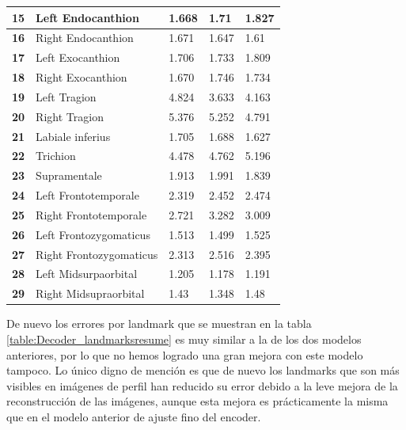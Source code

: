 \begin{table}[!ht]
\begin{tabular}{|l|l|l|l|l|}
                \textbf{15} & Left Endocanthion & \cellcolor{green!25} 1.668 & 1.71 & 1.827 \\ \hline
                \textbf{16} & Right Endocanthion & 1.671 & 1.647 & \cellcolor{green!25} 1.61 \\ \hline
                \textbf{17} & Left Exocanthion & \cellcolor{green!25} 1.706 & 1.733 & 1.809 \\ \hline
                \textbf{18} & Right Exocanthion & \cellcolor{green!25} 1.670 & 1.746 & 1.734 \\ \hline
                \textbf{19} & Left Tragion & 4.824 & \cellcolor{green!25} 3.633 & 4.163 \\ \hline
                \textbf{20} & Right Tragion & 5.376 & 5.252 & \cellcolor{green!25} 4.791 \\ \hline
                \textbf{21} & Labiale inferius & 1.705 & 1.688 & \cellcolor{green!25} 1.627 \\ \hline
                \textbf{22} & Trichion & \cellcolor{green!25} 4.478 & 4.762 & 5.196 \\ \hline
                \textbf{23} & Supramentale & 1.913 & 1.991 & \cellcolor{green!25} 1.839 \\ \hline
                \textbf{24} & Left Frontotemporale & \cellcolor{green!25} 2.319 & 2.452 & 2.474 \\ \hline
                \textbf{25} & Right Frontotemporale & \cellcolor{green!25} 2.721 & 3.282 & 3.009 \\ \hline
                \textbf{26} & Left Frontozygomaticus & 1.513 & \cellcolor{green!25} 1.499 & 1.525 \\ \hline
                \textbf{27} & Right Frontozygomaticus & \cellcolor{green!25} 2.313 & 2.516 & 2.395 \\ \hline
                \textbf{28} & Left Midsurpaorbital & 1.205 & \cellcolor{green!25} 1.178 & 1.191 \\ \hline
                \textbf{29} & Right Midsupraorbital & 1.43 & \cellcolor{green!25} 1.348 & 1.48 \\ \hline
            \end{tabular}
            \label{table:Decoder_landmarksresume}
        \end{table}
        \medskip 

        \noindent De nuevo los errores por landmark que se muestran en la tabla \autoref{table:Decoder_landmarksresume} es muy similar a la de los dos modelos anteriores, por lo que no hemos logrado una gran mejora con este modelo tampoco. Lo único digno de mención es que de nuevo los landmarks que son más visibles en imágenes de perfil han reducido su error debido a la leve mejora de la reconstrucción de las imágenes, aunque esta mejora es prácticamente la misma que en el modelo anterior de ajuste fino del encoder.

